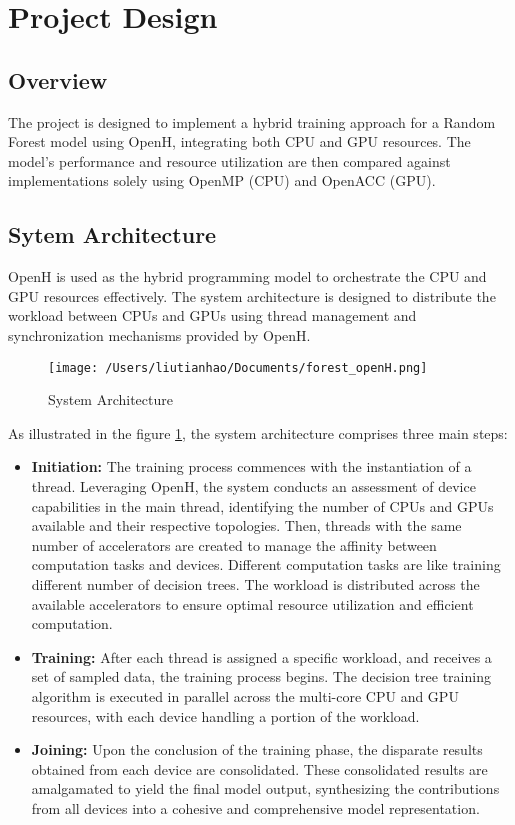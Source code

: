 \documentclass[13pt]{article}
\begin{document}
\section{Project Design}
\subsection{Overview}
The project is designed to implement a hybrid training approach for a Random Forest model using OpenH, integrating both CPU and GPU resources. 
The model's performance and resource utilization are then compared against implementations solely using OpenMP (CPU) and OpenACC (GPU).

\subsection{Sytem Architecture}
OpenH is used as the hybrid programming model to orchestrate the CPU and GPU resources effectively. 
The system architecture is designed to distribute the workload between CPUs and GPUs using thread management and synchronization mechanisms provided by OpenH.
\begin{figure}[h!]
    \centering
    \texttt{[image: /Users/liutianhao/Documents/forest\_openH.png]}
    \caption{System Architecture}
    \label{fig:system_architecture}
\end{figure}


As illustrated in the figure \ref{fig:system_architecture}, the system architecture comprises three main steps:
\begin{itemize}
    \item \textbf{Initiation:} 
    The training process commences with the instantiation of a thread.
    Leveraging OpenH, the system conducts an assessment of device capabilities in the main thread, identifying the number of CPUs and GPUs available and their respective topologies.
    Then, threads with the same number of accelerators are created to manage the affinity between computation tasks and devices.
    Different computation tasks are like training different number of decision trees. 
    The workload is distributed across the available accelerators to ensure optimal resource utilization and efficient computation.
    \item \textbf{Training:} 
    After each thread is assigned a specific workload, and receives a set of sampled data, the training process begins.
    The decision tree training algorithm is executed in parallel across the multi-core CPU and GPU resources, with each device handling a portion of the workload.
    \item \textbf{Joining:} 
    Upon the conclusion of the training phase, the disparate results obtained from each device are consolidated.
    These consolidated results are amalgamated to yield the final model output, synthesizing the contributions from all devices into a cohesive and comprehensive model representation.
\end{itemize}
\end{document}
